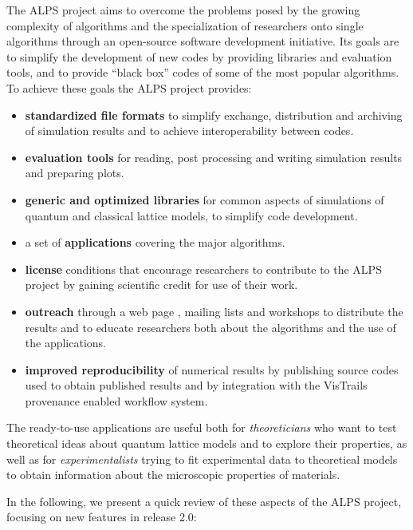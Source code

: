 \documentclass[12pt]{iopart}
\begin{document}
The ALPS project aims to
overcome the problems posed by the growing complexity of algorithms
and the specialization of researchers onto single algorithms through
an open-source software development initiative. Its goals are to simplify the development of new codes by providing libraries and evaluation tools, and to provide ``black box'' codes of some of the most popular algorithms. To achieve these goals the ALPS project provides:
\begin{itemize}
\item {\bf standardized file formats} to simplify exchange,
distribution and archiving of simulation results and to achieve
interoperability between codes.
\item {\bf evaluation tools} for reading, post processing and writing simulation results and preparing plots.

\item {\bf generic and optimized libraries} for common aspects of
simulations of quantum and classical lattice models, to simplify code
development.
\item a set of {\bf applications} covering the major algorithms.
\item{\bf license} conditions that encourage researchers to contribute
to the ALPS project by gaining scientific credit for use of their
work.
\item {\bf outreach} through a web page \cite{alps}, mailing lists and
workshops to distribute the results and to educate researchers both
about the algorithms and the use of the applications.
\item {\bf improved reproducibility} of numerical results by
publishing source codes used to obtain published results and by integration with the VisTrails \cite{vistrails} provenance enabled workflow system.
\end{itemize}

The ready-to-use applications are useful both for 
{\it theoreticians} who want to test theoretical ideas about quantum
lattice models and to explore their properties, as well as for 
{\it experimentalists} trying to fit experimental data to theoretical
models to obtain information about the microscopic properties of
materials.

 In the following, we present a quick review of these
 aspects of the ALPS project, focusing on new features in release 2.0:
 
\end{document}
